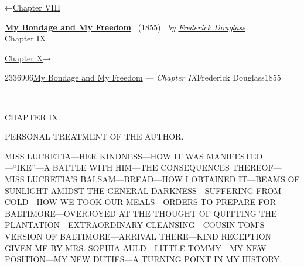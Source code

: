 \hypertarget{headerContainer}{}
\hypertarget{navigationHeader}{}
\protect\hypertarget{headerprevious}{}{←\href{/wiki/My_Bondage_and_My_Freedom_(1855)/Chapter_VIII}{Chapter
VIII}}

\textbf{\protect\hypertarget{header_title_text}{}{\href{/wiki/My_Bondage_and_My_Freedom_(1855)}{My
Bondage and My Freedom}}} ~(1855)~ \emph{by
\href{/wiki/Author:Frederick_Douglass}{\protect\hypertarget{header_author_text}{}{{Frederick
Douglass}}}}\\
\protect\hypertarget{header_section_text}{}{Chapter IX}

\protect\hypertarget{headernext}{}{\href{/wiki/My_Bondage_and_My_Freedom_(1855)/Chapter_X}{Chapter
X}→}

\hypertarget{navigationNotes}{}

\hypertarget{ws-data}{}
\protect\hypertarget{ws-article-id}{}{2336906}\protect\hypertarget{ws-title}{}{\href{/wiki/My_Bondage_and_My_Freedom_(1855)}{My
Bondage and My Freedom} --- \emph{Chapter
IX}}\protect\hypertarget{ws-author}{}{Frederick
Douglass}\protect\hypertarget{ws-year}{}{1855}

{\protect\hypertarget{129}{}{}}

~

{CHAPTER IX.}

PERSONAL TREATMENT OF THE AUTHOR.

{MISS LUCRETIA---HER KINDNESS---HOW IT WAS MANIFESTED---``IKE''---A
BATTLE WITH HIM---THE CONSEQUENCES THEREOF---MISS LUCRETIA'S
BALSAM---BREAD---HOW I OBTAINED IT---BEAMS OF SUNLIGHT AMIDST THE
GENERAL DARKNESS---SUFFERING FROM COLD---HOW WE TOOK OUR MEALS---ORDERS
TO PREPARE FOR BALTIMORE---OVERJOYED AT THE THOUGHT OF QUITTING THE
PLANTATION---EXTRAORDINARY CLEANSING---COUSIN TOM'S VERSION OF
BALTIMORE---ARRIVAL THERE---KIND RECEPTION GIVEN ME BY MRS. SOPHIA
AULD---LITTLE TOMMY---MY NEW POSITION---MY NEW DUTIES---A TURNING POINT
IN MY HISTORY.}


